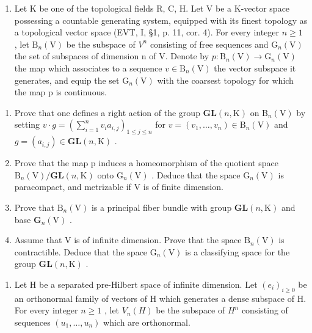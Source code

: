 \exercisegroup

\begin{enumerate}
\def\labelenumi{\arabic{enumi})}
\tightlist
\item
   Let K be one of the topological fields R, C, H. Let V be a K-vector space possessing a countable generating system, equipped with its finest topology as a topological vector space (EVT, I, §1, p. 11, cor. 4). For every integer \(n \geqslant 1\) , let \(\mathrm{B}_{n}(\mathrm{V})\) be the subspace of \(V^{n}\) consisting of free sequences and \(\mathrm{G}_{n}(\mathrm{V})\) the set of subspaces of dimension n of V. Denote by \(p: \mathrm{B}_{n}(\mathrm{V}) \to \mathrm{G}_{n}(\mathrm{V})\) the map which associates to a sequence \(v \in \mathrm{B}_{n}(\mathrm{V})\) the vector subspace it generates, and equip the set \(\mathrm{G}_{n}(\mathrm{V})\) with the coarsest topology for which the map p is continuous.
\end{enumerate}

\begin{enumerate}
\def\labelenumi{\alph{enumi})}
\item
   Prove that one defines a right action of the group \(\mathbf{GL}(n,\mathrm{K})\) on \(\mathrm{B}_{n}(\mathrm{V})\) by setting \(v \cdot g = (\sum_{i=1}^{n} v_{i} a_{i,j})_{1 \leqslant j \leqslant n}\) for \(v = (v_{1}, \ldots, v_{n}) \in \mathrm{B}_{n}(\mathrm{V})\) and \(g = (a_{i,j}) \in \mathbf{GL}(n, \mathrm{K})\) .
\item
  Prove that the map p induces a homeomorphism of the quotient space \(\mathrm{B}_{n}(\mathrm{V})/\mathbf{G}\mathbf{L}(n,\mathrm{K})\) onto \(\mathrm{G}_{n}(\mathrm{V})\) . Deduce that the space \(\mathrm{G}_{n}(\mathrm{V})\) is paracompact, and metrizable if V is of finite dimension.
\item
  Prove that \(\mathrm{B}_{n}(\mathrm{V})\) is a principal fiber bundle with group \(\mathbf{GL}(n,\mathrm{K})\) and base \(\mathbf{G}_{n}(\mathrm{V})\) .
\item
  Assume that V is of infinite dimension. Prove that the space \(\mathrm{B}_{n}(\mathrm{V})\) is contractible. Deduce that the space \(\mathrm{G}_{n}(\mathrm{V})\) is a classifying space for the group \(\mathbf{GL}(n,\mathrm{K})\) .
\end{enumerate}

\begin{enumerate}
\def\labelenumi{\arabic{enumi})}
\setcounter{enumi}{1}
\tightlist
\item
  Let H be a separated pre-Hilbert space of infinite dimension. Let \((e_{i})_{i\geqslant0}\) be an orthonormal family of vectors of H which generates a dense subspace of H. For every integer \(n\geqslant1\) , let \(V_{n}(H)\) be the subspace of \(H^{n}\) consisting of sequences \((u_{1},\ldots,u_{n})\) which are orthonormal.
\end{enumerate}

